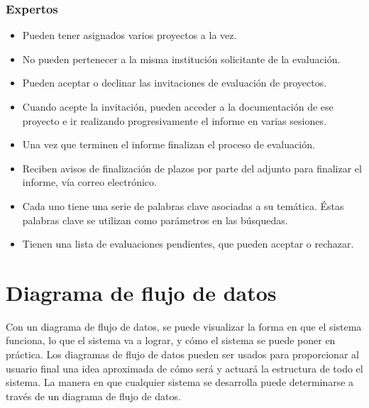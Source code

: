 \documentclass[12pt,a4paper,titlepage,spanish,twoside]{book}
\begin{document}
\subsection{Expertos}
\begin{itemize}
\item Pueden tener asignados varios proyectos a la vez. 
\item No pueden pertenecer a la misma institución solicitante de la evaluación.
\item Pueden aceptar o declinar las invitaciones de evaluación de proyectos.
\item Cuando acepte la invitación, pueden acceder a la documentación de ese
  proyecto e ir realizando progresivamente el informe en varias sesiones. 
\item Una vez que terminen el informe finalizan el proceso de evaluación.
\item Reciben avisos de finalización de plazos por parte del adjunto para
  finalizar el informe, vía correo electrónico.
\item Cada uno tiene una serie de palabras clave asociadas a su
  temática. Éstas palabras clave se utilizan como parámetros en las
  búsquedas. 
\item Tienen una lista de evaluaciones pendientes, que pueden aceptar o 
  re\-cha\-zar.
\end{itemize}

\chapter{Diagrama de flujo de datos}
Con un diagrama de flujo de datos, se puede visualizar la forma en que el 
sistema funciona, lo que el sistema va a lograr, y cómo el sistema se puede 
poner en práctica. Los diagramas de flujo de datos pueden ser usados para 
proporcionar al usuario final una idea aproximada de cómo será y actuará la
estructura de todo el sistema. La manera en que cualquier sistema se
desarrolla puede determinarse a través de un diagrama de flujo de
datos. \cite{piat}

\newpage
{}




\end{document}
